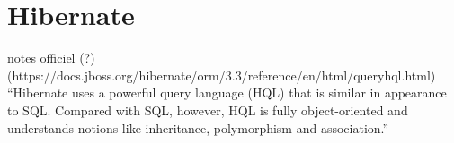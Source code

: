 \section{Hibernate}

notes officiel (?)
(https://docs.jboss.org/hibernate/orm/3.3/reference/en/html/queryhql.html)\\

``Hibernate uses a powerful query language (HQL) that is similar in appearance to SQL. Compared with SQL, however, HQL is fully object-oriented and understands notions like inheritance, polymorphism and association.''
